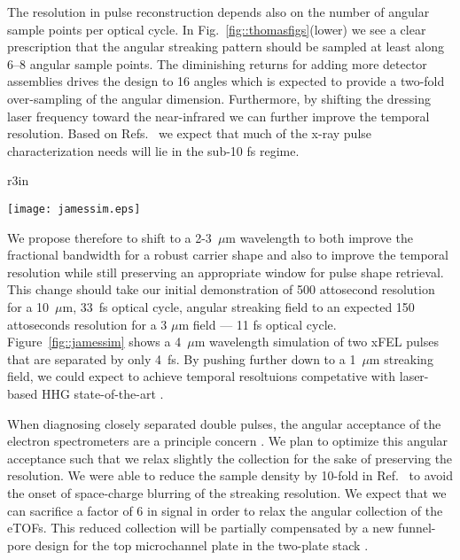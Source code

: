 The resolution in pulse reconstruction depends also on the number of angular sample points per optical cycle.
In Fig.~\ref{fig::thomasfigs}(lower) we see a clear prescription that the angular streaking pattern should be sampled at least along 6--8 angular sample points.
The diminishing returns for adding more detector assemblies drives the design to 16 angles which is expected to provide a two-fold over-sampling of the angular dimension.
Furthermore, by shifting the dressing laser frequency toward the near-infrared we can further improve the temporal resolution.
Based on Refs.~\cite{lcls2_opportunities,Cederbaum2008,Biggs2012,Mukamel2013} we expect that much of the x-ray pulse characterization needs will lie in the sub-10 fs regime.
\begin{wrapfigure}[18]{r}{3in}
\vspace{-0.5\baselineskip}
\centerline{\texttt{[image: jamessim.eps]}}
\vspace{-0.5\baselineskip}
\caption{\label{fig::jamessim}Simulation of two attosecond x-ray pulses separated by 4~fs dressed by a 4~$\mu$m streaking field, courtesy J.~Cryan.}
\end{wrapfigure}
We propose therefore to shift to a 2-3~$\mu$m wavelength to both improve the fractional bandwidth for a robust carrier shape and also to improve the temporal resolution while still preserving an appropriate window for pulse shape retrieval.
This change should take our initial demonstration of 500 attosecond resolution for a 10~$\mu$m, 33~fs optical cycle, angular streaking field to an expected 150 attoseconds resolution for a 3 $\mu$m field --- 11 fs optical cycle.
Figure~\ref{fig::jamessim} shows a 4~$\mu$m wavelength simulation of two xFEL pulses that are separated by only 4~fs.
By pushing further down to a 1~$\mu$m streaking field, we could expect to achieve temporal resoltuions competative with laser-based HHG state-of-the-art \cite{Zenghu2017,HJWorner2017}.

When diagnosing closely separated double pulses, the angular acceptance of the electron spectrometers are a principle concern \cite{Worner2018}.
We plan to optimize this angular acceptance such that we relax slightly the collection for the sake of preserving the resolution.
We were able to reduce the sample density by 10-fold in Ref.~\cite{Nick2018} to avoid the onset of space-charge blurring of the streaking resolution.
We expect that we can sacrifice a factor of 6 in signal in order to relax the angular collection of the eTOFs.
This reduced collection will be partially compensated by a new funnel-pore design for the top microchannel plate in the two-plate stack \cite{funnelMCPcompare2018}.

